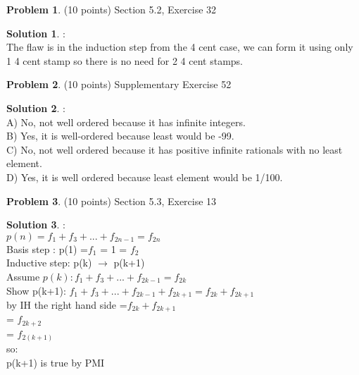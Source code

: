 \documentclass{article}
\theoremstyle{definition}
\newtheorem{problem}{Problem}
\newtheorem*{solution}{Solution}
\begin{document}
\newpage

\begin{problem} (10 points) Section 5.2, Exercise 32
\end{problem}
\begin{solution}:
\\
The flaw is in the induction step from the 4 cent case, we can form it using only 1 4 cent stamp so there is no need for 2 4 cent stamps.
\end{solution}

\newpage

\begin{problem} (10 points) Supplementary Exercise 52
\end{problem}
\begin{solution}:
\\
A) No, not well ordered because it has infinite integers.
\\
B) Yes, it is well-ordered because least would be -99. 
\\
C) No, not well ordered because it has positive infinite rationals with no least element.
\\
D) Yes, it is well ordered because least element would be 1/100.
\end{solution}

\newpage

\begin{problem} (10 points) Section 5.3, Exercise 13
\end{problem}
\begin{solution}:
\\
$p(n) = f_1 + f_3 +...+ f_{2n-1} = f_{2n}$
\\
Basis step : p(1) =$ f_1$ = 1 = $f_2$
\\
Inductive step: p(k) $\to$ p(k+1)
\\
Assume $p(k): f_1 + f_3 +...+f_{2k-1} = f_{2k}$
\\
Show p(k+1):  $f_1 + f_3 +...+ f_{2k-1} + f_{2k+1} = f_{2k} + f_{2k+1} $
\\
by IH  the right hand side =$ f_{2k} + f_{2k+1}$
\\ 
= $f_{2k+2}$
\\
= $f_{2(k+1)}$
\\
so:
\\
p(k+1) is true by PMI
\end{solution}

\newpage
\end{document}

